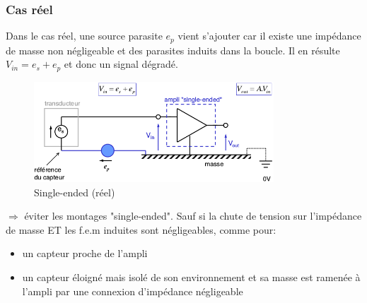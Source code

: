 \subsubsection{Cas réel}
Dans le cas réel, une source parasite \(e_p\) vient s'ajouter car il existe une impédance de masse non négligeable et des parasites induits dans la boucle. Il en résulte \(V_{in} = e_s + e_p\) et donc un signal dégradé.
\begin{figure}[H]
	\centering 
	\includegraphics[width=0.8\textwidth,height=10\baselineskip,keepaspectratio]{ch3/image12} 
	\caption{Single-ended (réel)} 
\end{figure}
\(\Rightarrow\) éviter les montages "single-ended". Sauf si la chute de tension sur l'impédance de masse ET les f.e.m induites sont négligeables, comme pour:
\begin{itemize}
	\item un capteur proche de l'ampli
	\item un capteur éloigné mais isolé de son environnement et sa masse est ramenée à l'ampli par une connexion d'impédance négligeable
\end{itemize}
